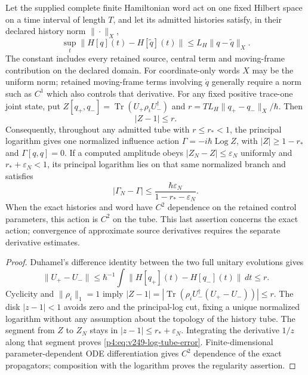 \documentclass[12pt,a4paper]{article}
\begin{document}
\begin{proposition}
\label{p4:prop:v249-uniform-log-tube}
Let the supplied complete finite Hamiltonian word act on one fixed Hilbert
space on a time interval of length $T$, and let its admitted histories satisfy,
in their declared history norm $\|\cdot\|_X$,
\[
 \sup_t\|H[q](t)-H[\widetilde q](t)\|
 \le L_H\|q-\widetilde q\|_X.
\]
The constant includes every retained source, central term and moving-frame
contribution on the declared domain. For coordinate-only words $X$ may be
the uniform norm; retained moving-frame terms involving $\dot q$ generally
require a norm such as $C^1$ which also controls that derivative.
For any fixed positive trace-one joint
state, put $Z[q_+,q_-]=\operatorname{Tr}(U_+\rho_i U_-^\dagger)$ and
$r=T L_H\|q_+-q_-\|_X/\hbar$. Then
\begin{equation}
 \boxed{|Z-1|\le r.}
 \label{p4:eq:v249-log-tube}
\end{equation}
Consequently, throughout any admitted tube with $r\le r_*<1$, the principal
logarithm gives one normalized influence action
$\Gamma=-i\hbar\operatorname{Log}Z$, with
$|Z|\ge1-r_*$ and $\Gamma[q,q]=0$.
If a computed amplitude obeys $|Z_N-Z|\le\varepsilon_N$ uniformly and
$r_*+\varepsilon_N<1$, its principal logarithm lies on that same normalized
branch and satisfies
\begin{equation}
 |\Gamma_N-\Gamma|
 \le \frac{\hbar\varepsilon_N}{1-r_*-\varepsilon_N}.
 \label{p4:eq:v249-log-tube-error}
\end{equation}
When the exact histories and word have $C^2$ dependence on the retained
control parameters, this action is $C^2$ on the tube. This last assertion
concerns the exact action; convergence of approximate source derivatives
requires the separate derivative estimates.
\end{proposition}
\begin{proof}
Duhamel's difference identity between the two full unitary evolutions gives
\[
 \|U_+-U_-\|\le\hbar^{-1}\int
       \|H[q_+](t)-H[q_-](t)\|\,dt\le r.
\]
Cyclicity and $\|\rho_i\|_1=1$ imply
$|Z-1|=|\operatorname{Tr}(\rho_i U_-^\dagger(U_+-U_-))|\le r$.
The disk $|z-1|<1$ avoids zero and the principal-log cut, fixing a unique
normalized logarithm without any assumption about the topology of the
history tube. The segment from $Z$ to $Z_N$ stays in
$|z-1|\le r_*+\varepsilon_N$. Integrating the derivative $1/z$ along that
segment proves \eqref{p4:eq:v249-log-tube-error}. Finite-dimensional
parameter-dependent ODE differentiation gives $C^2$ dependence of the exact
propagators; composition with the logarithm proves the regularity assertion.
\end{proof}
\end{document}
